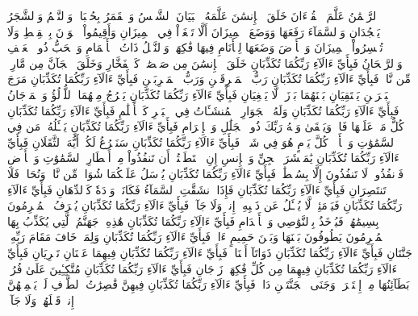 ٱلرَّحۡمَٰنُ
عَلَّمَ ٱلۡقُرۡءَانَ
خَلَقَ ٱلۡإِنسَٰنَ
عَلَّمَهُ ٱلۡبَيَانَ
ٱلشَّمۡسُ وَٱلۡقَمَرُ بِحُسۡبَانٖ
وَٱلنَّجۡمُ وَٱلشَّجَرُ يَسۡجُدَانِ
وَٱلسَّمَآءَ رَفَعَهَا وَوَضَعَ ٱلۡمِيزَانَ
أَلَّا تَطۡغَوۡاْ فِي ٱلۡمِيزَانِ
وَأَقِيمُواْ ٱلۡوَزۡنَ بِٱلۡقِسۡطِ وَلَا تُخۡسِرُواْ ٱلۡمِيزَانَ
وَٱلۡأَرۡضَ وَضَعَهَا لِلۡأَنَامِ
فِيهَا فَٰكِهَةٞ وَٱلنَّخۡلُ ذَاتُ ٱلۡأَكۡمَامِ
وَٱلۡحَبُّ ذُو ٱلۡعَصۡفِ وَٱلرَّيۡحَانُ
فَبِأَيِّ ءَالَآءِ رَبِّكُمَا تُكَذِّبَانِ
خَلَقَ ٱلۡإِنسَٰنَ مِن صَلۡصَٰلٖ كَٱلۡفَخَّارِ
وَخَلَقَ ٱلۡجَآنَّ مِن مَّارِجٖ مِّن نَّارٖ
فَبِأَيِّ ءَالَآءِ رَبِّكُمَا تُكَذِّبَانِ
رَبُّ ٱلۡمَشۡرِقَيۡنِ وَرَبُّ ٱلۡمَغۡرِبَيۡنِ
فَبِأَيِّ ءَالَآءِ رَبِّكُمَا تُكَذِّبَانِ
مَرَجَ ٱلۡبَحۡرَيۡنِ يَلۡتَقِيَانِ
بَيۡنَهُمَا بَرۡزَخٞ لَّا يَبۡغِيَانِ
فَبِأَيِّ ءَالَآءِ رَبِّكُمَا تُكَذِّبَانِ
يَخۡرُجُ مِنۡهُمَا ٱللُّؤۡلُؤُ وَٱلۡمَرۡجَانُ
فَبِأَيِّ ءَالَآءِ رَبِّكُمَا تُكَذِّبَانِ
وَلَهُ ٱلۡجَوَارِ ٱلۡمُنشَـَٔاتُ فِي ٱلۡبَحۡرِ كَٱلۡأَعۡلَٰمِ
فَبِأَيِّ ءَالَآءِ رَبِّكُمَا تُكَذِّبَانِ
كُلُّ مَنۡ عَلَيۡهَا فَانٖ
وَيَبۡقَىٰ وَجۡهُ رَبِّكَ ذُو ٱلۡجَلَٰلِ وَٱلۡإِكۡرَامِ
فَبِأَيِّ ءَالَآءِ رَبِّكُمَا تُكَذِّبَانِ
يَسۡـَٔلُهُۥ مَن فِي ٱلسَّمَٰوَٰتِ وَٱلۡأَرۡضِۚ كُلَّ يَوۡمٍ هُوَ فِي شَأۡنٖ
فَبِأَيِّ ءَالَآءِ رَبِّكُمَا تُكَذِّبَانِ
سَنَفۡرُغُ لَكُمۡ أَيُّهَ ٱلثَّقَلَانِ
فَبِأَيِّ ءَالَآءِ رَبِّكُمَا تُكَذِّبَانِ
يَٰمَعۡشَرَ ٱلۡجِنِّ وَٱلۡإِنسِ إِنِ ٱسۡتَطَعۡتُمۡ أَن تَنفُذُواْ مِنۡ أَقۡطَارِ ٱلسَّمَٰوَٰتِ وَٱلۡأَرۡضِ فَٱنفُذُواْۚ لَا تَنفُذُونَ إِلَّا بِسُلۡطَٰنٖ
فَبِأَيِّ ءَالَآءِ رَبِّكُمَا تُكَذِّبَانِ
يُرۡسَلُ عَلَيۡكُمَا شُوَاظٞ مِّن نَّارٖ وَنُحَاسٞ فَلَا تَنتَصِرَانِ
فَبِأَيِّ ءَالَآءِ رَبِّكُمَا تُكَذِّبَانِ
فَإِذَا ٱنشَقَّتِ ٱلسَّمَآءُ فَكَانَتۡ وَرۡدَةٗ كَٱلدِّهَانِ
فَبِأَيِّ ءَالَآءِ رَبِّكُمَا تُكَذِّبَانِ
فَيَوۡمَئِذٖ لَّا يُسۡـَٔلُ عَن ذَنۢبِهِۦٓ إِنسٞ وَلَا جَآنّٞ
فَبِأَيِّ ءَالَآءِ رَبِّكُمَا تُكَذِّبَانِ
يُعۡرَفُ ٱلۡمُجۡرِمُونَ بِسِيمَٰهُمۡ فَيُؤۡخَذُ بِٱلنَّوَٰصِي وَٱلۡأَقۡدَامِ
فَبِأَيِّ ءَالَآءِ رَبِّكُمَا تُكَذِّبَانِ
هَٰذِهِۦ جَهَنَّمُ ٱلَّتِي يُكَذِّبُ بِهَا ٱلۡمُجۡرِمُونَ
يَطُوفُونَ بَيۡنَهَا وَبَيۡنَ حَمِيمٍ ءَانٖ
فَبِأَيِّ ءَالَآءِ رَبِّكُمَا تُكَذِّبَانِ
وَلِمَنۡ خَافَ مَقَامَ رَبِّهِۦ جَنَّتَانِ
فَبِأَيِّ ءَالَآءِ رَبِّكُمَا تُكَذِّبَانِ
ذَوَاتَآ أَفۡنَانٖ
فَبِأَيِّ ءَالَآءِ رَبِّكُمَا تُكَذِّبَانِ
فِيهِمَا عَيۡنَانِ تَجۡرِيَانِ
فَبِأَيِّ ءَالَآءِ رَبِّكُمَا تُكَذِّبَانِ
فِيهِمَا مِن كُلِّ فَٰكِهَةٖ زَوۡجَانِ
فَبِأَيِّ ءَالَآءِ رَبِّكُمَا تُكَذِّبَانِ
مُتَّكِـِٔينَ عَلَىٰ فُرُشِۭ بَطَآئِنُهَا مِنۡ إِسۡتَبۡرَقٖۚ وَجَنَى ٱلۡجَنَّتَيۡنِ دَانٖ
فَبِأَيِّ ءَالَآءِ رَبِّكُمَا تُكَذِّبَانِ
فِيهِنَّ قَٰصِرَٰتُ ٱلطَّرۡفِ لَمۡ يَطۡمِثۡهُنَّ إِنسٞ قَبۡلَهُمۡ وَلَا جَآنّٞ
